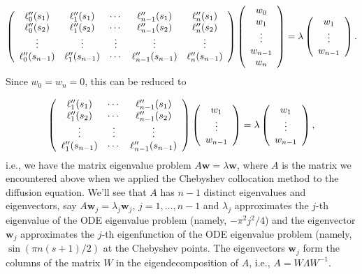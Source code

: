\documentclass[12pt,a4paper]{article}
\begin{document}
\[
\left(
\begin{array}{c c c c c}
\ell''_0(s_1) &\ell''_1(s_1) & \cdots &\ell''_{n-1}(s_1) & \ell''_{n}(s_1) \\
\ell''_0(s_2) &\ell''_1(s_2) & \cdots &\ell''_{n-1}(s_2) & \ell''_{n}(s_2)  \\
     \vdots  & \vdots & \vdots & \vdots & \vdots  \\
\ell''_0(s_{n-1}) &\ell''_1(s_{n-1}) & \cdots &\ell''_{n-1}(s_{n-1}) & \ell''_{n}(s_{n-1})
\end{array} 
\right)\left(
\begin{array}{c}
w_0 \\
w_1 \\
\vdots \\
w_{n-1} \\
w_n
\end{array}
\right) = \lambda
\left(
\begin{array}{c}
w_1 \\
\vdots \\
w_{n-1} 
\end{array}
\right).
\]
Since $w_0=w_n=0$, this can be reduced to

\[
\left(
\begin{array}{ c c c }
\ell''_1(s_1) & \cdots &\ell''_{n-1}(s_1)  \\
\ell''_1(s_2) & \cdots &\ell''_{n-1}(s_2)   \\
    \vdots & \vdots & \vdots  \\
\ell''_1(s_{n-1}) & \cdots &\ell''_{n-1}(s_{n-1}) 
\end{array} 
\right)\left(
\begin{array}{c}
w_1 \\
\vdots \\
w_{n-1} 
\end{array}
\right) = \lambda
\left(
\begin{array}{c}
w_1 \\
\vdots \\
w_{n-1} 
\end{array}
\right),
\]
i.e., we have the matrix eigenvalue problem $A\mathbf{w} = \lambda\mathbf{w}$, where $A$ is the matrix we encountered above when we applied the Chebyshev collocation method to the diffusion equation. We'll see that $A$ has $n-1$ distinct eigenvalues and eigenvectors, say $A\mathbf{w}_j = \lambda_j \mathbf{w}_j$, $j = 1, \ldots, n-1$ and $\lambda_j$ approximates the $j$-th eigenvalue of the ODE eigenvalue problem (namely, $-\pi^2j^2/4$) and the eigenvector $\mathbf{w}_j$ approximates the $j$-th eigenfunction of the ODE eigenvalue problem (namely, $\sin(\pi n(s +1)/2)$ at the Chebyshev points.  The eigenvectors $\mathbf{w}_j$ form the columns of the matrix $W$ in the eigendecomposition of $A$, i.e., $A = W\Lambda W^{-1}$.
\end{document}
